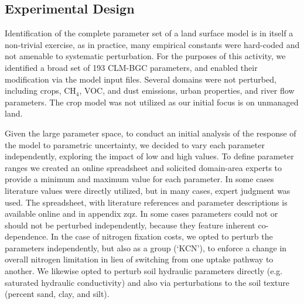 \documentclass[draft]{agujournal2019}
\begin{document}
\subsection{Experimental Design}
Identification of the complete parameter set of a land surface model is in itself a non-trivial exercise, as in practice, many empirical constants were hard-coded and not amenable to systematic perturbation. For the purposes of this activity, we identified a broad set of 193 CLM-BGC parameters, and enabled their modification via the model input files. Several domains were not perturbed, including crops, CH$_4$, VOC, and dust emissions, urban properties, and river flow parameters. The crop model was not utilized as our initial focus is on unmanaged land.

Given the large parameter space, to conduct an initial analysis of the response of the model to parametric uncertainty, we decided to vary each parameter independently, exploring the impact of low and high values. To define parameter ranges we created an online spreadsheet and solicited domain-area experts to provide a minimum and maximum value for each parameter. In some cases literature values were directly utilized, but in many cases, expert judgment was used. The spreadsheet, with literature references and parameter descriptions is available online and in appendix zqz. In some cases parameters could not or should not be perturbed independently, because they feature inherent co-dependence. In the case of nitrogen fixation costs, we opted to perturb the parameters independently, but also as a group (`KCN'), to enforce a change in overall nitrogen limitation in lieu of switching from one uptake pathway to another. We likewise opted to perturb soil hydraulic parameters directly (e.g. saturated hydraulic conductivity) and also via perturbations to the soil texture (percent sand, clay, and silt).
\end{document}
